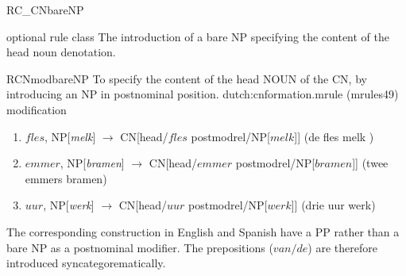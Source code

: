 \begin{mruleclass}{RC\_CNbareNP}
\begin{classdescr}
\kind optional rule class
\classtask The introduction of a bare NP specifying the content of the head 
noun denotation.
\classremarks

\nofilters
\nospeedrules
\noplannedrules
\norulesnotince
\begin{comments}
\end{comments}

\end{classdescr}

\begin{members}
\begin{member}
 RCNmodbareNP
 To specify the content of the head NOUN of the CN, by
introducing an NP in postnominal position.
\file dutch:cnformation.mrule (mrules49)
\semantics modification
\example

\begin{enumerate} 
  \item $fles$, NP[{\em melk}] $\rightarrow$ CN[head/$fles$ postmodrel/NP[$melk$]] (de fles melk
)
  \item $emmer$, NP[{\em bramen}] $\rightarrow$ CN[head/$emmer$ postmodrel/NP[$bramen$]] (twee 
emmers bramen)
  \item $uur$, NP[{\em werk}] $\rightarrow$ CN[head/$uur$ postmodrel/NP[$werk$]] (drie uur werk)
\end{enumerate}
\remarks The corresponding construction in English and Spanish have a PP rather 
than a bare NP as a postnominal  modifier. The prepositions ($van/de$)
are therefore 
introduced syncategorematically.
\end{member}
\end{members}   
\end{mruleclass}


